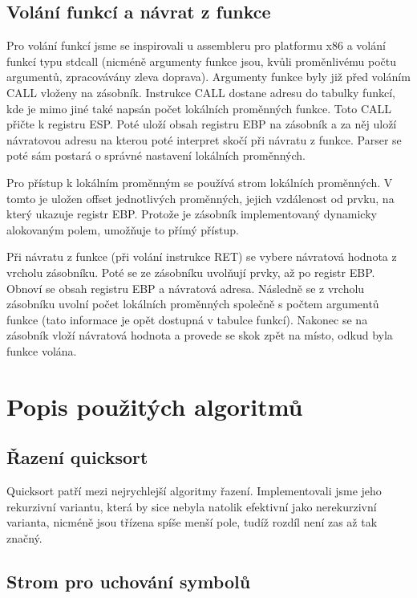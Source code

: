 \documentclass[a4paper,11pt,titlepage]{article}
\begin{document}
\subsection{Volání funkcí a návrat z funkce}

Pro volání funkcí jsme se inspirovali u assembleru pro platformu x86 a volání funkcí typu stdcall (nicméně argumenty funkce jsou, kvůli proměnlivému počtu argumentů, zpracovávány zleva doprava). Argumenty funkce byly již před voláním CALL vloženy na zásobník. Instrukce CALL dostane adresu do tabulky funkcí, kde je mimo jiné také napsán počet lokálních pro\-měn\-ných funkce. Toto CALL přičte k registru ESP. Poté uloží obsah registru EBP na zásobník a za něj uloží návratovou adresu na kterou poté interpret skočí při návratu z funkce. Parser se poté sám postará o správné nastavení lokálních proměnných.


Pro přístup k lokálním proměnným se používá strom lokálních pro\-měn\-ných. V tomto je uložen offset jednotlivých proměnných, jejich vzdálenost od prvku, na který ukazuje registr EBP. Protože je zásobník implementovaný dynamicky alokovaným polem, umožňuje to přímý přístup.


Při návratu z funkce (při volání instrukce RET) se vybere návratová hodnota z vrcholu zásobníku. Poté se ze zásobníku uvolňují prvky, až po registr EBP. Obnoví se obsah registru EBP a návratová adresa. Následně se z vrcholu zásobníku uvolní počet lokálních proměnných společně s počtem argumentů funkce (tato informace je opět dostupná v tabulce funkcí). Nakonec se na zásobník vloží návratová hodnota a provede se skok zpět na místo, odkud byla funkce volána.

\section{Popis použitých algoritmů}

\subsection{Řazení quicksort}

Quicksort patří mezi nejrychlejší algoritmy řazení. Implementovali jsme jeho rekurzivní variantu, která by sice nebyla natolik efektivní jako nerekurzivní varianta, nicméně jsou třízena spíše menší pole, tudíž rozdíl není zas až tak značný.

\subsection{Strom pro uchování symbolů}
\end{document}

